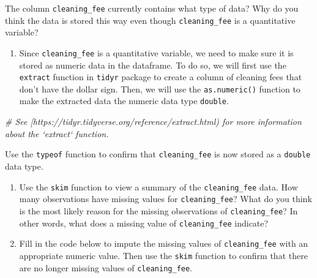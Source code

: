 \documentclass[]{book}
\newenvironment{Shaded}{\begin{snugshade}}{\end{snugshade}}
\newcommand{\KeywordTok}[1]{\textcolor[rgb]{0.13,0.29,0.53}{\textbf{#1}}}
\newcommand{\DataTypeTok}[1]{\textcolor[rgb]{0.13,0.29,0.53}{#1}}
\newcommand{\StringTok}[1]{\textcolor[rgb]{0.31,0.60,0.02}{#1}}
\newcommand{\CommentTok}[1]{\textcolor[rgb]{0.56,0.35,0.01}{\textit{#1}}}
\newcommand{\OperatorTok}[1]{\textcolor[rgb]{0.81,0.36,0.00}{\textbf{#1}}}
\newcommand{\NormalTok}[1]{#1}
\providecommand{\tightlist}{%
  \setlength{\itemsep}{0pt}\setlength{\parskip}{0pt}}
\begin{document}
The column \texttt{cleaning\_fee} currently contains what type of data?
Why do you think the data is stored this way even though
\texttt{cleaning\_fee} is a quantitative variable?

\begin{enumerate}
\def\labelenumi{\arabic{enumi}.}
\setcounter{enumi}{2}
\tightlist
\item
  Since \texttt{cleaning\_fee} is a quantitative variable, we need to
  make sure it is stored as numeric data in the dataframe. To do so, we
  will first use the \texttt{extract} function in \texttt{tidyr} package
  to create a column of cleaning fees that don't have the dollar sign.
  Then, we will use the \texttt{as.numeric()} function to make the
  extracted data the numeric data type \texttt{double}.
\end{enumerate}

\begin{Shaded}
\begin{Highlighting}[]
\CommentTok{# See [https://tidyr.tidyverse.org/reference/extract.html) for more information about the `extract` function.}
\end{Highlighting}
\end{Shaded}

\begin{Shaded}
\end{Shaded}

Use the \texttt{typeof} function to confirm that \texttt{cleaning\_fee}
is now stored as a \texttt{double} data type.

\begin{enumerate}
\def\labelenumi{\arabic{enumi}.}
\setcounter{enumi}{3}
\item
  Use the \texttt{skim} function to view a summary of the
  \texttt{cleaning\_fee} data. How many observations have missing values
  for \texttt{cleaning\_fee}? What do you think is the most likely
  reason for the missing observations of \texttt{cleaning\_fee}? In
  other words, what does a missing value of \texttt{cleaning\_fee}
  indicate?
\item
  Fill in the code below to impute the missing values of
  \texttt{cleaning\_fee} with an appropriate numeric value. Then use the
  \texttt{skim} function to confirm that there are no longer missing
  values of \texttt{cleaning\_fee}.
\end{enumerate}
\end{document}
